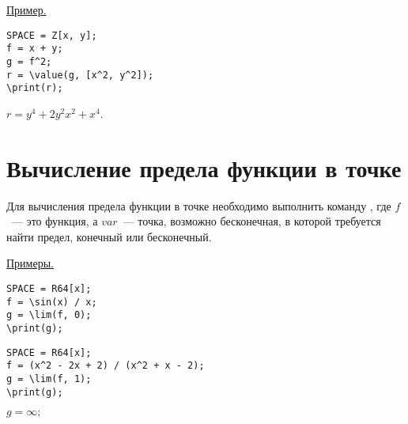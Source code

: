 \underline{Пример. }

\vspace*{-2mm}%
\begin{verbatim}
SPACE = Z[x, y];
f = x + y;
g = f^2;
r = \value(g, [x^2, y^2]);
\print(r);
\end{verbatim}

{$r=y^{4}+2y^{2}x^{2}+x^{4}$.}

\section{Вычисление предела функции в точке }

Для вычисления предела функции в точке необходимо выполнить команду 
,  
где $f$~--- это  функция,  а $var$~--- точка,  возможно бесконечная,  в которой требуется найти предел,  конечный или бесконечный. 

\smallskip
\underline{Примеры. }
\begin{verbatim}
SPACE = R64[x];
f = \sin(x) / x;
g = \lim(f, 0);
\print(g);
\end{verbatim}

\vspace*{-3mm}



\begin{verbatim}
SPACE = R64[x];
f = (x^2 - 2x + 2) / (x^2 + x - 2);
g = \lim(f, 1);
\print(g);
\end{verbatim}
\vspace*{-3mm}

{$g = \infty;$}

